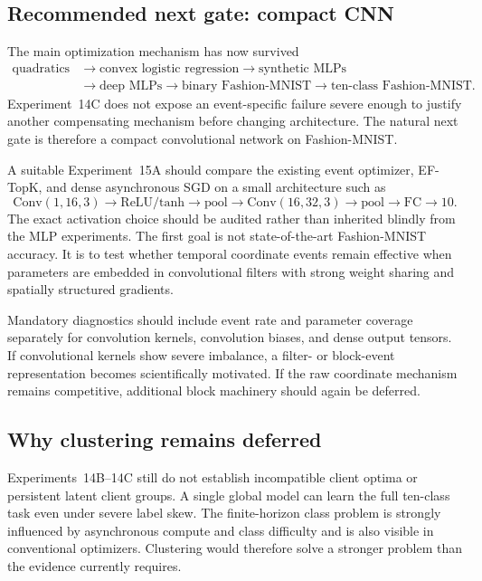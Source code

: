 \subsection{Recommended next gate: compact CNN}

The main optimization mechanism has now survived
\begin{equation}
\begin{aligned}
\text{quadratics}
&\rightarrow \text{convex logistic regression}
\rightarrow \text{synthetic MLPs}\\
&\rightarrow \text{deep MLPs}
\rightarrow \text{binary Fashion-MNIST}
\rightarrow \text{ten-class Fashion-MNIST}.
\end{aligned}
\end{equation}
Experiment~14C does not expose an event-specific failure severe enough to justify another compensating mechanism before changing architecture. The natural next gate is therefore a compact convolutional network on Fashion-MNIST.

A suitable Experiment~15A should compare the existing event optimizer, EF-TopK, and dense asynchronous SGD on a small architecture such as
\begin{equation}
\mathrm{Conv}(1,16,3)
\rightarrow
\mathrm{ReLU/tanh}
\rightarrow
\mathrm{pool}
\rightarrow
\mathrm{Conv}(16,32,3)
\rightarrow
\mathrm{pool}
\rightarrow
\mathrm{FC}
\rightarrow10.
\end{equation}
The exact activation choice should be audited rather than inherited blindly from the MLP experiments. The first goal is not state-of-the-art Fashion-MNIST accuracy. It is to test whether temporal coordinate events remain effective when parameters are embedded in convolutional filters with strong weight sharing and spatially structured gradients.

Mandatory diagnostics should include event rate and parameter coverage separately for convolution kernels, convolution biases, and dense output tensors. If convolutional kernels show severe imbalance, a filter- or block-event representation becomes scientifically motivated. If the raw coordinate mechanism remains competitive, additional block machinery should again be deferred.

\subsection{Why clustering remains deferred}

Experiments~14B--14C still do not establish incompatible client optima or persistent latent client groups. A single global model can learn the full ten-class task even under severe label skew. The finite-horizon class problem is strongly influenced by asynchronous compute and class difficulty and is also visible in conventional optimizers. Clustering would therefore solve a stronger problem than the evidence currently requires.

